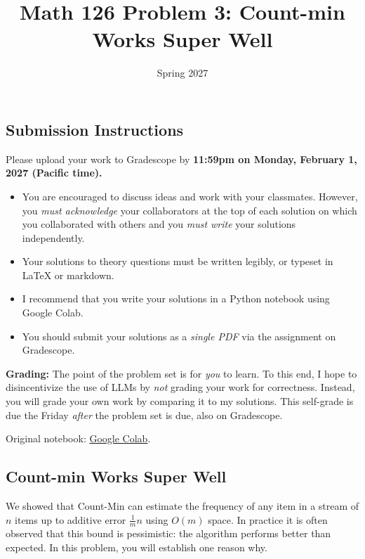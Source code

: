 \documentclass{article}
\title{Math 126 Problem 3: Count-min Works Super Well}
\author{} %
\date{Spring 2027}
\begin{document}
\maketitle

\hypertarget{submission-instructions}{%
\subsection*{Submission Instructions}\label{submission-instructions}}

Please upload your work to Gradescope by \textbf{11:59pm on Monday, February 1, 2027 (Pacific time).}

\begin{itemize}
\item
  You are encouraged to discuss ideas and work with your classmates. However, you \emph{must acknowledge} your collaborators at the top of each solution on which you collaborated with others and you \emph{must write} your solutions independently.
\item
  Your solutions to theory questions must be written legibly, or typeset in LaTeX or markdown.
\item
  I recommend that you write your solutions in a Python notebook using Google Colab.
\item
  You should submit your solutions as a \emph{single PDF} via the assignment on Gradescope.
\end{itemize}

\textbf{Grading:} The point of the problem set is for \emph{you} to learn. To this end, I hope to disincentivize the use of LLMs by \emph{not} grading your work for correctness. Instead, you will grade your own work by comparing it to my solutions. This self-grade is due the Friday \emph{after} the problem set is due, also on Gradescope.

\noindent Original notebook: \href{https://colab.research.google.com/drive/1qu-ejYqkDLDEhy8UQOnguYA1U2qA9G_R?usp=sharing}{Google Colab}.

\hypertarget{count-min-works-super-well}{%
\subsection*{Count-min Works Super Well}\label{count-min-works-super-well}}

We showed that Count-Min can estimate the frequency of any item in a stream of \(n\) items up to additive error \(\frac{1}{m} n\) using \(O(m)\) space. In practice it is often observed that this bound is pessimistic: the algorithm performs better than expected. In this problem, you will establish one reason why.
\end{document}
